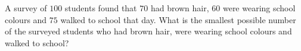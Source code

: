 A survey of $100$ students found that $70$ had brown hair, $60$ were wearing school colours and $75$ walked to school that day. What is the smallest possible number of the surveyed students who had brown hair, were wearing school colours and walked to school?
